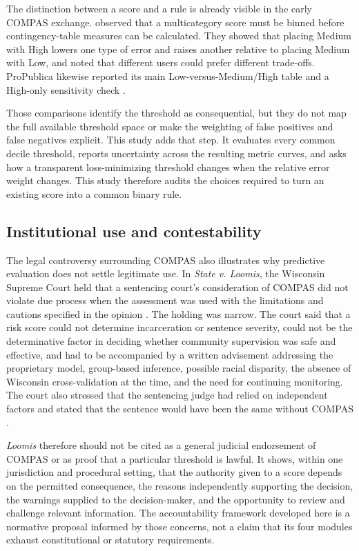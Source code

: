 \documentclass[11pt,letterpaper]{article}
\begin{document}
The distinction between a score and a rule is already visible in the early COMPAS exchange. \citet{flores2016} observed that a multicategory score must be binned before contingency-table measures can be calculated. They showed that placing Medium with High lowers one type of error and raises another relative to placing Medium with Low, and noted that different users could prefer different trade-offs. ProPublica likewise reported its main Low-versus-Medium/High table and a High-only sensitivity check \citep{larson2016}.

Those comparisons identify the threshold as consequential, but they do not map the full available threshold space or make the weighting of false positives and false negatives explicit. This study adds that step. It evaluates every common decile threshold, reports uncertainty across the resulting metric curves, and asks how a transparent loss-minimizing threshold changes when the relative error weight changes. This study therefore audits the choices required to turn an existing score into a common binary rule.

\subsection{Institutional use and contestability}

The legal controversy surrounding COMPAS also illustrates why predictive evaluation does not settle legitimate use. In \textit{State v. Loomis}, the Wisconsin Supreme Court held that a sentencing court's consideration of COMPAS did not violate due process when the assessment was used with the limitations and cautions specified in the opinion \citep[paras. 98--100, 120]{loomis2016}. The holding was narrow. The court said that a risk score could not determine incarceration or sentence severity, could not be the determinative factor in deciding whether community supervision was safe and effective, and had to be accompanied by a written advisement addressing the proprietary model, group-based inference, possible racial disparity, the absence of Wisconsin cross-validation at the time, and the need for continuing monitoring. The court also stressed that the sentencing judge had relied on independent factors and stated that the sentence would have been the same without COMPAS \citep[paras. 104--109]{loomis2016}.

\textit{Loomis} therefore should not be cited as a general judicial endorsement of COMPAS or as proof that a particular threshold is lawful. It shows, within one jurisdiction and procedural setting, that the authority given to a score depends on the permitted consequence, the reasons independently supporting the decision, the warnings supplied to the decision-maker, and the opportunity to review and challenge relevant information. The accountability framework developed here is a normative proposal informed by those concerns, not a claim that its four modules exhaust constitutional or statutory requirements.
\end{document}
